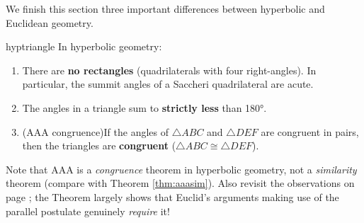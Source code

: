 \goodbreak



We finish this section three important differences between hyperbolic and Euclidean geometry.

\begin{thm}{}{hyptriangle}
	In hyperbolic geometry:
	\begin{enumerate}\itemsep0pt
	  \item There are \textbf{no rectangles} (quadrilaterals with four right-angles). In particular, the summit angles of a Saccheri quadrilateral are acute.
	  \item The angles in a triangle sum to \textbf{strictly less} than \ang{180}.
	  \item (AAA congruence)\lstsp If the angles of $\triangle ABC$ and $\triangle DEF$ are congruent in pairs, then the triangles are \textbf{congruent} ($\triangle ABC\cong\triangle DEF$).
	\end{enumerate}
\end{thm}

Note that AAA is a \emph{congruence} theorem in hyperbolic geometry, not a \emph{similarity} theorem (compare with Theorem \ref{thm:aaasim}). Also revisit the observations on page \pageref{pg:absolute}; the Theorem largely shows that Euclid's arguments making use of the parallel postulate genuinely \emph{require} it! 


